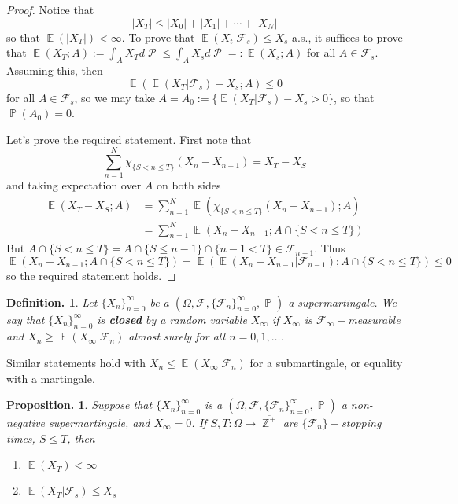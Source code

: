 \documentclass[11pt, a4paper]{memoir}
\DeclareMathOperator{\Z}{{\mathbb{Z}}}
\theoremstyle{change}
\newtheorem{proposition}[theorem]{Proposition.}
\theoremstyle{plain}
\theoremstyle{nonumberplain}
\newtheorem{definition}{Definition.}
\newtheorem{proof}{Proof}
\DeclareMathOperator{\ps}{{\mathcal{P}}}
\DeclareMathOperator{\pr}{{\mathbb{P}}}
\DeclareMathOperator{\E}{{\mathbb{E}}}
\newcommand{\defn}[1]{{\boldmath\bfseries #1}}
\numberwithin{equation}{section}
\begin{document}
\begin{proof}
    Notice that
    \begin{equation*}
        |X_T|\leq|X_0|+|X_1|+\cdots+|X_N|
    \end{equation*}
    so that $\E(|X_T|)<\infty$.
    To prove that $\E(X_t|\mathcal{F}_s)\leq X_s$ a.s., it suffices to prove that $\E(X_T;A):=\int_A X_Td\ps\leq\int_A X_s d\ps=:\E(X_s;A)$ for all $A\in\mathcal{F}_s$.
    Assuming this, then
    \begin{equation*}
        \E(\E(X_T|\mathcal{F}_s)-X_s;A)\leq 0
    \end{equation*}
    for all $A\in\mathcal{F}_s$, so we may take $A=A_0:=\{\E(X_T|\mathcal{F}_s)-X_s>0\}$, so that $\pr(A_0)=0$.

    Let's prove the required statement.
    First note that
    \begin{equation*}
        \sum_{n=1}^N \chi_{\{S<n\leq T\}}(X_n-X_{n-1})=X_T-X_S
    \end{equation*}
    and taking expectation over $A$ on both sides
    \begin{align*}
        \E(X_T-X_S;A) &= \sum_{n=1}^N\E(\chi_{\{S<n\leq T\}}(X_n-X_{n-1});A)\\
                      &= \sum_{n=1}^N\E(X_n-X_{n-1};A\cap\{S<n\leq T\})
    \end{align*}
    But $A\cap\{S<n\leq T\}=A\cap\{S\leq n-1\}\cap\{n-1<T\}\in\mathcal{F}_{n-1}$.
    Thus
    \begin{equation*}
        \E(X_n-X_{n-1}; A\cap\{S<n\leq T\})=\E(\E(X_n-X_{n-1}|\mathcal{F}_{n-1});A\cap\{S<n\leq T\})\leq 0
    \end{equation*}
    so the required statement holds.
\end{proof}
\begin{definition}
    Let $\{X_n\}_{n=0}^\infty$ be a $(\Omega,\mathcal{F},\{\mathcal{F}_n\}_{n=0}^\infty,\pr)$ a supermartingale.
    We say that $\{X_n\}_{n=0}^\infty$ is \defn{closed} by a random variable $X_\infty$ if $X_\infty$ is $\mathcal{F}_\infty-$measurable and $X_n\geq\E(X_\infty|\mathcal{F}_n)$ almost surely for all $n=0,1,\ldots$.
\end{definition}
Similar statements hold with $X_n\leq\E(X_\infty|\mathcal{F}_n)$ for a submartingale, or equality with a martingale.
\begin{proposition}
    Suppose that $\{X_n\}_{n=0}^\infty$ is a $(\Omega,\mathcal{F},\{\mathcal{F}_n\}_{n=0}^\infty,\pr)$ a non-negative supermartingale, and $X_\infty=0$.
    If $S,T:\Omega\to\overline{\Z^+}$ are $\{\mathcal{F}_n\}-$stopping times, $S\leq T$, then
    \begin{enumerate}[nl]
        \item $\E(X_T)<\infty$
        \item $\E(X_T|\mathcal{F}_s)\leq X_s$
    \end{enumerate}
\end{proposition}
\end{document}

